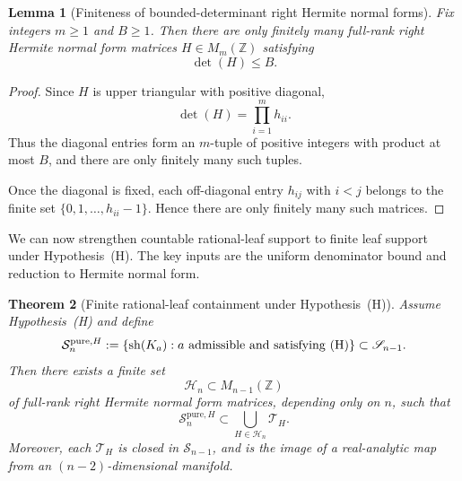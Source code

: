 \documentclass[11pt,letterpaper]{amsart}
\newcommand{\Z}{\mathbb{Z}}
\theoremstyle{plain}
\newtheorem{theorem}{Theorem}[section]
\newtheorem{lemma}[theorem]{Lemma}
\theoremstyle{definition}
\begin{document}
\begin{lemma}[Finiteness of bounded-determinant right Hermite normal forms]
\label{lem:finite-HNF-bounded-det}
Fix integers \(m\ge 1\) and \(B\ge 1\). Then there are only finitely many
full-rank right Hermite normal form matrices \(H\in M_m(\Z)\) satisfying
\[
\det(H)\le B.
\]
\end{lemma}

\begin{proof}
Since \(H\) is upper triangular with positive diagonal,
\[
\det(H)=\prod_{i=1}^m h_{ii}.
\]
Thus the diagonal entries form an \(m\)-tuple of positive integers with product
at most \(B\), and there are only finitely many such tuples.

Once the diagonal is fixed, each off-diagonal entry \(h_{ij}\) with \(i<j\)
belongs to the finite set \(\{0,1,\dots,h_{ii}-1\}\). Hence there are only
finitely many such matrices.
\end{proof}

We can now strengthen countable rational-leaf support to finite leaf support under Hypothesis~\textup{(H)}. The key inputs are the uniform denominator bound and reduction to Hermite normal form.


\begin{theorem}[Finite rational-leaf containment under Hypothesis~\textup{(H)}]
\label{thm:countable-thinness-fixed-leaf}
Assume Hypothesis~\textup{(H)} and define
\[
\mathcal S_n^{\mathrm{pure},H}
:=
\{\operatorname{sh}(K_a): a\text{ admissible and satisfying \textup{(H)}}\}
\subset \mathscr S_{n-1}.
\]
Then there exists a finite set
\[
\mathcal H_n\subset M_{n-1}(\Z)
\]
of full-rank right Hermite normal form matrices, depending only on \(n\), such
that
\[
\mathcal S_n^{\mathrm{pure},H}
\subset
\bigcup_{H\in \mathcal H_n}\mathcal T_H.
\]
Moreover, each \(\mathcal T_H\) is closed in \(\mathscr S_{n-1}\), and is the
image of a real-analytic map from an \((n-2)\)-dimensional manifold.
\end{theorem}
\end{document}
